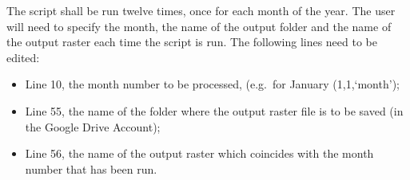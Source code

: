 \documentclass[
  10pt,
  b5paper,
]{book}
\providecommand{\tightlist}{%
  \setlength{\itemsep}{0pt}\setlength{\parskip}{0pt}}
\begin{document}
The script shall be run twelve times, once for each month of the year. The user will need to specify the month, the name of the output folder and the name of the output raster each time the script is run. The following lines need to be edited:

\begin{itemize}
\tightlist
\item
  Line 10, the month number to be processed, (e.g.~for January (1,1,`month');
\item
  Line 55, the name of the folder where the output raster file is to be saved (in the Google Drive Account);
\item
  Line 56, the name of the output raster which coincides with the month number that has been run.
\end{itemize}
\end{document}
